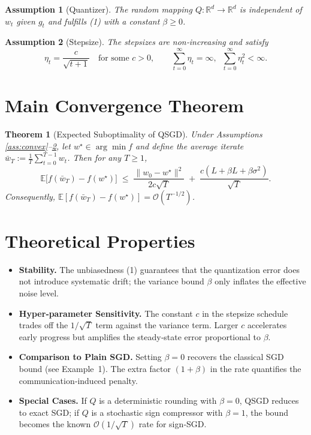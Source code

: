 \documentclass{article}
\newtheorem{theorem}{Theorem}
\newtheorem{assumption}{Assumption}
\newcommand{\E}{\mathbb{E}}
\newcommand{\R}{\mathbb{R}}
\begin{document}
\begin{assumption}[Quantizer]\label{ass:quant}
The random mapping $Q:\R^{d}\to\R^{d}$ is independent of $w_{t}$ given $g_{t}$ and fulfills (1) with a constant $\beta\ge0$.
\end{assumption}

\begin{assumption}[Stepsize]\label{ass:stepsize}
The stepsizes are non‑increasing and satisfy
\[
\eta_{t}= \frac{c}{\sqrt{t+1}}\quad\text{for some }c>0,\qquad 
\sum_{t=0}^{\infty}\eta_{t}= \infty,\;\; \sum_{t=0}^{\infty}\eta_{t}^{2}<\infty .
\]
\end{assumption}

\section*{Main Convergence Theorem}
\begin{theorem}[Expected Suboptimality of QSGD]\label{thm:main}
Under Assumptions \ref{ass:convex}–\ref{ass:stepsize}, let $w^{\star}\in\arg\min f$ and define the average iterate $\bar w_{T}:=\frac{1}{T}\sum_{t=0}^{T-1}w_{t}$. Then for any $T\ge1$,
\[
\E\!\big[f(\bar w_{T})-f(w^{\star})\big]\;\le\;
\frac{\|w_{0}-w^{\star}\|^{2}}{2c\sqrt{T}}
\;+\;
\frac{c(L+\beta L+\beta\sigma^{2})}{\sqrt{T}} .
\]
Consequently, $\E[f(\bar w_{T})-f(w^{\star})]=\mathcal O(T^{-1/2})$.
\end{theorem}

\section*{Theoretical Properties}
\begin{itemize}[leftmargin=*]
\item \textbf{Stability.} The unbiasedness (1) guarantees that the quantization error does not introduce systematic drift; the variance bound $\beta$ only inflates the effective noise level.
\item \textbf{Hyper‑parameter Sensitivity.} The constant $c$ in the stepsize schedule trades off the $1/\sqrt{T}$ term against the variance term. Larger $c$ accelerates early progress but amplifies the steady‑state error proportional to $\beta$.
\item \textbf{Comparison to Plain SGD.} Setting $\beta=0$ recovers the classical SGD bound (see Example 1). The extra factor $(1+\beta)$ in the rate quantifies the communication‑induced penalty.
\item \textbf{Special Cases.} If $Q$ is a deterministic rounding with $\beta=0$, QSGD reduces to exact SGD; if $Q$ is a stochastic sign compressor with $\beta=1$, the bound becomes the known $\mathcal O(1/\sqrt{T})$ rate for sign‑SGD.
\end{itemize}
\end{document}
